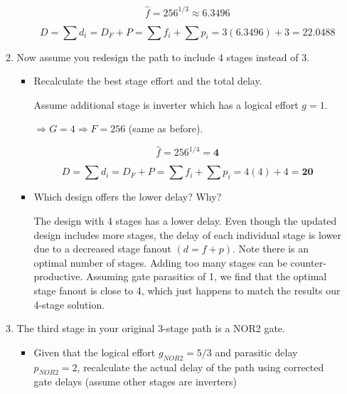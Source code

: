 \documentclass[fleqn]{article}
\begin{document}
\begin{enumerate}
\begin{enumerate}
\begin{itemize}
				\begin{equation*}
					\hat{f} = 256^{1/3} \approx \mathbf{6.3496}
				\end{equation*}
					
				\begin{equation*}
					D = \sum{d_i} = D_F + P = \sum{f_i} + \sum{p_i} = 3(6.3496) + 3 = \mathbf{22.0488}
				\end{equation*}	
					
			\end{itemize}
			
			\item Now assume you redesign the path to include 4 stages instead of 3.
			
			\begin{itemize}
				\item Recalculate the best stage effort and the total delay.
				
					Assume additional stage is inverter which has a logical effort $g = 1$.
					
					$\Rightarrow G = 4 \Rightarrow F = 256$ (same as before).
					
					\begin{equation*}
						\hat{f} = 256^{1/4} = \mathbf{4}
					\end{equation*}
					
					\begin{equation*}
						D = \sum{d_i} = D_F + P = \sum{f_i} + \sum{p_i} = 4(4) + 4 = \mathbf{20}
					\end{equation*}	
				
				\item Which design offers the lower delay? Why?
				
				The design with 4 stages has a lower delay. Even though the updated design includes more stages, the delay of each individual stage is lower due to a decreased stage fanout $(d = f + p)$. Note there is an optimal number of stages. Adding too many stages can be counter-productive. Assuming gate parasitics of 1, we find that the optimal stage fanout is close to 4, which just happens to match the results our 4-stage solution.
				
			\end{itemize}
			
			\item The third stage in your original 3-stage path is a NOR2 gate.
			
			\begin{itemize}
				\item Given that the logical effort $g_{NOR2} = 5/3$ and parasitic delay $p_{NOR2} = 2$, recalculate the actual delay of the path using corrected gate delays (assume other stages are inverters)
				

\end{itemize}
\end{enumerate}
\end{enumerate}
\end{document}
